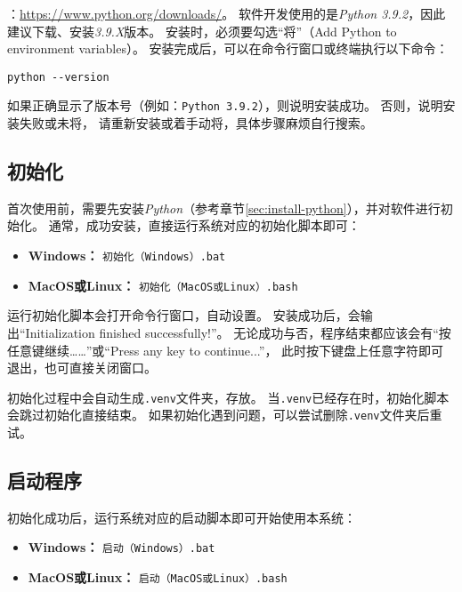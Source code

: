 \documentclass[12pt,titlepage]{article}
\newcommand{\Python}{\textit{Python}}
\begin{document}
：\url{https://www.python.org/downloads/}。
软件开发使用的是\textit{Python 3.9.2}，因此建议下载、安装\textit{3.9.X}版本。
安装时，必须要勾选“将”（Add Python to environment variables）。
安装完成后，可以在命令行窗口或终端执行以下命令：

\begin{verbatim}
python --version
\end{verbatim}

如果正确显示了版本号（例如：\texttt{Python 3.9.2}），则说明安装成功。
否则，说明安装失败或未将，
请重新安装或着手动将，具体步骤麻烦自行搜索。

\subsection{初始化}

首次使用前，需要先安装\Python（参考章节\ref{sec:install-python}），并对软件进行初始化。
通常，成功安装，直接运行系统对应的初始化脚本即可：

\begin{itemize}
    \item \textbf{Windows：} \texttt{初始化（Windows）.bat}
    \item \textbf{MacOS或Linux：} \texttt{初始化（MacOS或Linux）.bash}
\end{itemize}

运行初始化脚本会打开命令行窗口，自动设置。
安装成功后，会输出“Initialization finished successfully!”。
无论成功与否，程序结束都应该会有“按任意键继续……”或“Press any key to continue...”，
此时按下键盘上任意字符即可退出，也可直接关闭窗口。

初始化过程中会自动生成\texttt{.venv}文件夹，存放。
当\texttt{.venv}已经存在时，初始化脚本会跳过初始化直接结束。
如果初始化遇到问题，可以尝试删除\texttt{.venv}文件夹后重试。

\subsection{启动程序}

初始化成功后，运行系统对应的启动脚本即可开始使用本系统：

\begin{itemize}
    \item \textbf{Windows：} \texttt{启动（Windows）.bat}
    \item \textbf{MacOS或Linux：} \texttt{启动（MacOS或Linux）.bash}
\end{itemize}
\end{document}
